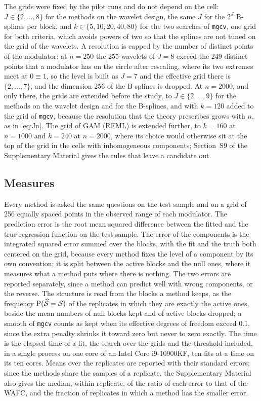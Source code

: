 The grids were fixed by the pilot runs and do not depend on the cell:
$J \in \{2,\dots,8\}$ for the methods on the wavelet design, the same $J$ for
the $2^J$ B-splines per block, and $k \in \{5, 10, 20, 40, 80\}$ for the two
searches of \texttt{mgcv}, one grid for both criteria, which avoids powers of
two so that the splines are not tuned on the grid of the wavelets. A
resolution is capped by the number of distinct points of the modulator: at
$n = 250$ the 255 wavelets of $J = 8$ exceed the 249 distinct points that a
modulator has on the circle after rescaling, where its two extremes meet at
$0 \equiv 1$, so the level is built as $J = 7$ and the effective grid there
is $\{2,\dots,7\}$, and the dimension 256 of the B-splines is dropped. At
$n = 2000$, and only there, the grids are extended before the study, to
$J \in \{2,\dots,9\}$ for the methods on the wavelet design and for the
B-splines, and with $k = 120$ added to the grid of \texttt{mgcv}, because the
resolution that the theory prescribes grows with $n$, as in \eqref{eq:Jn}.
The grid of GAM (REML) is extended further, to $k = 160$ at $n = 1000$ and
$k = 240$ at $n = 2000$, where its choice would otherwise sit at the top of
the grid in the cells with inhomogeneous components; Section~S9 of the
Supplementary Material gives the rules that leave a candidate out.

\subsection{Measures}
\label{sec:sim-measures}

Every method is asked the same questions on the test sample and on a grid of
256 equally spaced points in the observed range of each modulator. The
prediction error is the root mean squared difference between the fitted and
the true regression function on the test sample. The error of the components
is the integrated squared error summed over the blocks, with the fit and the
truth both centered on the grid, because every method fixes the level of a
component by its own convention; it is split between the active blocks and
the null ones, where it measures what a method puts where there is nothing.
The two errors are reported separately, since a method can predict well with
wrong components, or the reverse. The structure is read from the blocks a
method keeps, as the frequency $\mathrm{P}(\widehat{\mathcal{S}} = \mathcal{S})$ of
the replicates in which they are exactly the active ones, beside the mean
numbers of null blocks kept and of active blocks dropped; a smooth of
\texttt{mgcv} counts as kept when its effective degrees of freedom exceed
$0.1$, since the extra penalty shrinks it toward zero but never to zero
exactly. The time is the elapsed time of a fit, the search over the grids and
the threshold included, in a single process on one core of an Intel Core
i9-10900KF, ten fits at a time on its ten cores. Means over
the replicates are reported with their standard errors; since the methods
share the samples of a replicate, the Supplementary Material also gives the
median, within replicate, of the ratio of each error to that of the WAFC, and
the fraction of replicates in which a method has the smaller error.

